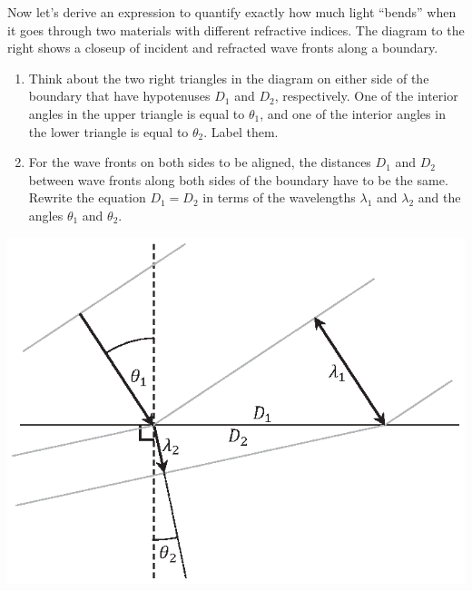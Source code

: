 \begin{minipage}{0.44\textwidth}

Now let's derive an expression to quantify exactly how much light ``bends'' when it goes through two materials with different refractive indices.  The diagram to the right shows a closeup of incident and refracted wave fronts along a boundary.

\begin{enumerate}[labparts]

\item Think about the two right triangles in the diagram on either side of the boundary that have hypotenuses $D_1$ and $D_2$, respectively.  One of the interior angles in the upper triangle is equal to $\theta_1$, and one of the interior angles in the lower triangle is equal to $\theta_2$.  Label them.

\item For the wave fronts on both sides to be aligned, the distances $D_1$ and $D_2$ between wave fronts along both sides of the boundary have to be the same.  Rewrite the equation $D_1 = D_2$ in terms of the wavelengths $\lambda_1$ and $\lambda_2$ and the angles $\theta_1$ and $\theta_2$.
\answerspace{0.7in}
\end{enumerate}
\end{minipage}
\begin{minipage}{0.55\textwidth}
\begin{flushright}
\vspace{-0.4in}
\includegraphics{deriving_snells_law/deriving_snell.eps}
\end{flushright}
\end{minipage}

